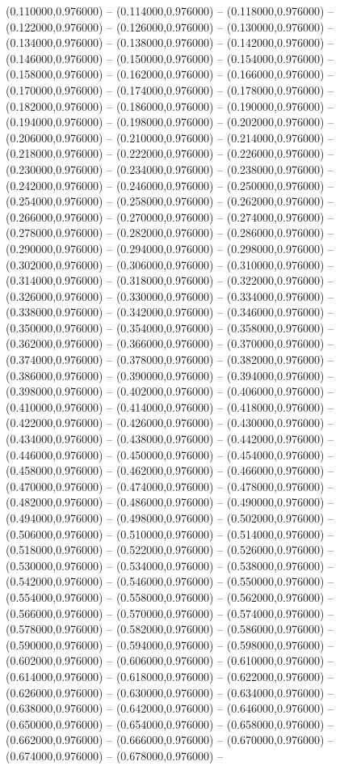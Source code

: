    (0.110000,0.976000) -- (0.114000,0.976000) -- (0.118000,0.976000) -- (0.122000,0.976000) -- (0.126000,0.976000) -- (0.130000,0.976000) -- (0.134000,0.976000) -- (0.138000,0.976000) -- (0.142000,0.976000) -- (0.146000,0.976000) -- (0.150000,0.976000) -- (0.154000,0.976000) -- (0.158000,0.976000) -- (0.162000,0.976000) -- (0.166000,0.976000) -- (0.170000,0.976000) -- (0.174000,0.976000) -- (0.178000,0.976000) -- (0.182000,0.976000) -- (0.186000,0.976000) -- (0.190000,0.976000) -- (0.194000,0.976000) -- (0.198000,0.976000) -- (0.202000,0.976000) -- (0.206000,0.976000) -- (0.210000,0.976000) -- (0.214000,0.976000) -- (0.218000,0.976000) -- (0.222000,0.976000) -- (0.226000,0.976000) -- (0.230000,0.976000) -- (0.234000,0.976000) -- (0.238000,0.976000) -- (0.242000,0.976000) -- (0.246000,0.976000) -- (0.250000,0.976000) -- (0.254000,0.976000) -- (0.258000,0.976000) -- (0.262000,0.976000) -- (0.266000,0.976000) -- (0.270000,0.976000) -- (0.274000,0.976000) -- (0.278000,0.976000) -- (0.282000,0.976000) -- (0.286000,0.976000) -- (0.290000,0.976000) -- (0.294000,0.976000) -- (0.298000,0.976000) -- (0.302000,0.976000) -- (0.306000,0.976000) -- (0.310000,0.976000) -- (0.314000,0.976000) -- (0.318000,0.976000) -- (0.322000,0.976000) -- (0.326000,0.976000) -- (0.330000,0.976000) -- (0.334000,0.976000) -- (0.338000,0.976000) -- (0.342000,0.976000) -- (0.346000,0.976000) -- (0.350000,0.976000) -- (0.354000,0.976000) -- (0.358000,0.976000) -- (0.362000,0.976000) -- (0.366000,0.976000) -- (0.370000,0.976000) -- (0.374000,0.976000) -- (0.378000,0.976000) -- (0.382000,0.976000) -- (0.386000,0.976000) -- (0.390000,0.976000) -- (0.394000,0.976000) -- (0.398000,0.976000) -- (0.402000,0.976000) -- (0.406000,0.976000) -- (0.410000,0.976000) -- (0.414000,0.976000) -- (0.418000,0.976000) -- (0.422000,0.976000) -- (0.426000,0.976000) -- (0.430000,0.976000) -- (0.434000,0.976000) -- (0.438000,0.976000) -- (0.442000,0.976000) -- (0.446000,0.976000) -- (0.450000,0.976000) -- (0.454000,0.976000) -- (0.458000,0.976000) -- (0.462000,0.976000) -- (0.466000,0.976000) -- (0.470000,0.976000) -- (0.474000,0.976000) -- (0.478000,0.976000) -- (0.482000,0.976000) -- (0.486000,0.976000) -- (0.490000,0.976000) -- (0.494000,0.976000) -- (0.498000,0.976000) -- (0.502000,0.976000) -- (0.506000,0.976000) -- (0.510000,0.976000) -- (0.514000,0.976000) -- (0.518000,0.976000) -- (0.522000,0.976000) -- (0.526000,0.976000) -- (0.530000,0.976000) -- (0.534000,0.976000) -- (0.538000,0.976000) -- (0.542000,0.976000) -- (0.546000,0.976000) -- (0.550000,0.976000) -- (0.554000,0.976000) -- (0.558000,0.976000) -- (0.562000,0.976000) -- (0.566000,0.976000) -- (0.570000,0.976000) -- (0.574000,0.976000) -- (0.578000,0.976000) -- (0.582000,0.976000) -- (0.586000,0.976000) -- (0.590000,0.976000) -- (0.594000,0.976000) -- (0.598000,0.976000) -- (0.602000,0.976000) -- (0.606000,0.976000) -- (0.610000,0.976000) -- (0.614000,0.976000) -- (0.618000,0.976000) -- (0.622000,0.976000) -- (0.626000,0.976000) -- (0.630000,0.976000) -- (0.634000,0.976000) -- (0.638000,0.976000) -- (0.642000,0.976000) -- (0.646000,0.976000) -- (0.650000,0.976000) -- (0.654000,0.976000) -- (0.658000,0.976000) -- (0.662000,0.976000) -- (0.666000,0.976000) -- (0.670000,0.976000) -- (0.674000,0.976000) -- (0.678000,0.976000) -- 